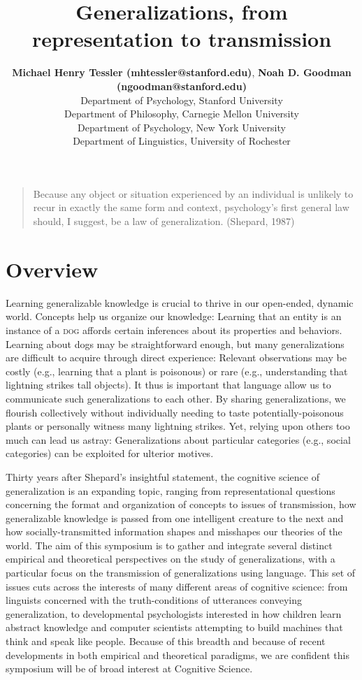 \documentclass[10pt,letterpaper]{article}
\title{Generalizations, from representation to transmission}
\author{{\large \bf Michael Henry Tessler (mhtessler@stanford.edu)}, {\large \bf Noah D. Goodman (ngoodman@stanford.edu)}  \\
  Department of Psychology, Stanford University
   \AND {\large \bf David Danks (ddanks@cmu.edu)} \\
  Department of Philosophy, Carnegie Mellon University
    \AND {\large \bf Marjorie Rhodes (marjorie.rhodes@nyu.edu)} \\
  Department of Psychology, New York University
    \AND {\large \bf Gregory Carlson (calrson@ling.rochester.edu)} \\
  Department of Linguistics, University of Rochester
  }
\begin{document}
\maketitle



\begin{quote}
Because any object or situation experienced by an individual is unlikely to recur in exactly the same form and context, psychology's first general law should, I suggest, be a law of generalization.  (Shepard, 1987)
\end{quote}

\section{Overview}

Learning generalizable knowledge is crucial to thrive in our open-ended, dynamic world. 
Concepts help us organize our knowledge: Learning that an entity is an instance of a \textsc{dog} affords certain inferences about its properties and behaviors.
Learning about dogs may be straightforward enough, but many generalizations are difficult to acquire through direct experience: Relevant observations may be costly (e.g., learning that a plant is poisonous) or rare (e.g., understanding that lightning strikes tall objects). 
It thus is important that language allow us to communicate such generalizations to each other. 
By sharing generalizations, we flourish collectively without individually needing to taste potentially-poisonous plants or personally witness many lightning strikes.
Yet, relying upon others too much can lead us astray: Generalizations about particular categories (e.g., social categories) can be exploited for ulterior motives. 

Thirty years after Shepard's insightful statement, the cognitive science of generalization is an expanding topic, ranging from representational questions concerning the format and organization of concepts to issues of transmission, how generalizable knowledge is passed from one intelligent creature to the next and how socially-transmitted information shapes and misshapes our theories of the world.
The aim of this symposium is to gather and integrate several distinct empirical and theoretical perspectives on the study of generalizations, with a particular focus on the transmission of generalizations using language.
This set of issues cuts across the interests of many different areas of cognitive science: from linguists concerned with the truth-conditions of utterances conveying generalization, to developmental psychologists interested in how children learn abstract knowledge and computer scientists attempting to build machines that think and speak like people. 
Because of this breadth and because of recent developments in both empirical and theoretical paradigms, we are confident this symposium will be of broad interest at Cognitive Science.
\end{document}
